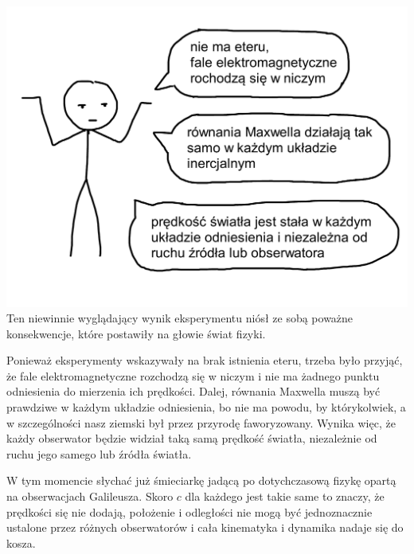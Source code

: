 \documentclass[10pt,twocolumn,fleqn,polish]{article}
\begin{document}
\noindent\includegraphics[width=1\linewidth]{pages/STA-page13}
Ten niewinnie wyglądający wynik eksperymentu niósł ze sobą poważne
konsekwencje, które postawiły na głowie świat fizyki.

Ponieważ eksperymenty wskazywały na brak istnienia eteru, trzeba było
przyjąć, że fale elektromagnetyczne rozchodzą się w niczym i nie ma żadnego
punktu odniesienia do mierzenia ich prędkości. Dalej, równania Maxwella
muszą być prawdziwe w każdym układzie odniesienia, bo nie ma powodu, by
którykolwiek, a w szczególności nasz ziemski był przez przyrodę faworyzowany.
Wynika więc, że każdy obserwator będzie widział taką samą prędkość światła,
niezależnie od ruchu jego samego lub źródła światła.

W tym momencie słychać już śmieciarkę jadącą po dotychczasową fizykę
opartą na obserwacjach Galileusza. Skoro $c$ dla każdego jest takie same
to znaczy, że prędkości się nie dodają, położenie i odległości nie mogą być
jednoznacznie ustalone przez różnych obserwatorów i cała kinematyka i dynamika
nadaje się do kosza.
\newpage
\end{document}
